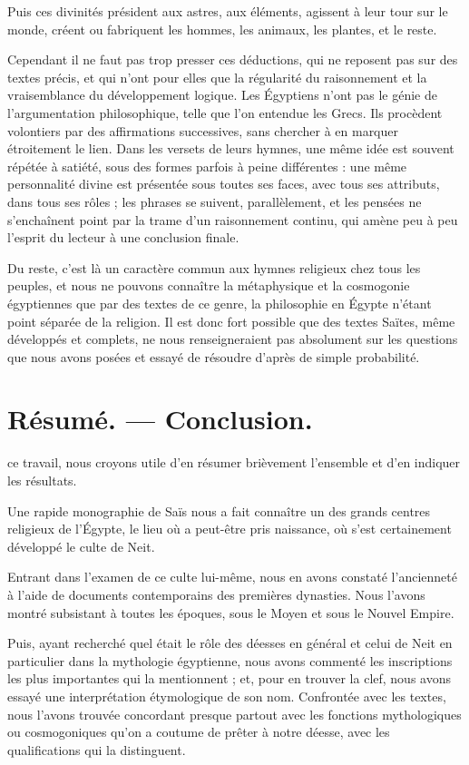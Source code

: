 \documentclass[letterpaper,twocolumn,openany,nodeprecatedcode]{dndbook}
\begin{document}
Puis ces divinités président aux astres, aux éléments, agissent à leur tour sur le monde, créent ou fabriquent les hommes, les animaux, les plantes, et le reste.

Cependant il ne faut pas trop presser ces déductions, qui ne reposent pas sur des textes précis, et qui n'ont pour elles que la régularité du raisonnement et la vraisemblance du développement logique. Les Égyptiens n'ont pas le génie de l'argumentation philosophique, telle que l'on entendue les Grecs. Ils procèdent volontiers par des affirmations successives, sans chercher à en marquer étroitement le lien. Dans les versets de leurs hymnes, une même idée est souvent répétée à satiété, sous des formes parfois à peine différentes : une même personnalité divine est présentée sous toutes ses faces, avec tous ses attributs, dans tous ses rôles ; les phrases se suivent, parallèlement, et les pensées ne s'enchaînent point par la trame d'un raisonnement continu, qui amène peu à peu l'esprit du lecteur à une conclusion finale.

Du reste, c'est là un caractère commun aux hymnes religieux chez tous les peuples, et nous ne pouvons connaître la métaphysique et la cosmogonie égyptiennes que par des textes de ce genre, la philosophie en Égypte n'étant point séparée de la religion. Il est donc fort possible que des textes Saïtes, même développés et complets, ne nous renseigneraient pas absolument sur les questions que nous avons posées et essayé de résoudre d'après de simple probabilité.
\clearpage
\chapter{Résumé. --- Conclusion.}
 ce travail, nous croyons utile d'en résumer brièvement l'ensemble et d'en indiquer les résultats.

Une rapide monographie de Saïs nous a fait connaître un des grands centres religieux de l'Égypte, le lieu où a peut-être pris naissance, où s'est certainement développé le culte de Neit.

Entrant dans l'examen de ce culte lui-même, nous en avons constaté l'ancienneté à l'aide de documents contemporains des premières dynasties. Nous l'avons montré subsistant à toutes les époques, sous le Moyen et sous le Nouvel Empire.

Puis, ayant recherché quel était le rôle des déesses en général et celui de Neit en particulier dans la mythologie égyptienne, nous avons commenté les inscriptions les plus importantes qui la mentionnent ; et, pour en trouver la clef, nous avons essayé une interprétation étymologique de son nom. Confrontée avec les textes, nous l'avons trouvée concordant presque partout avec les fonctions mythologiques ou cosmogoniques qu'on a coutume de prêter à notre déesse, avec les qualifications qui la distinguent.
\end{document}
